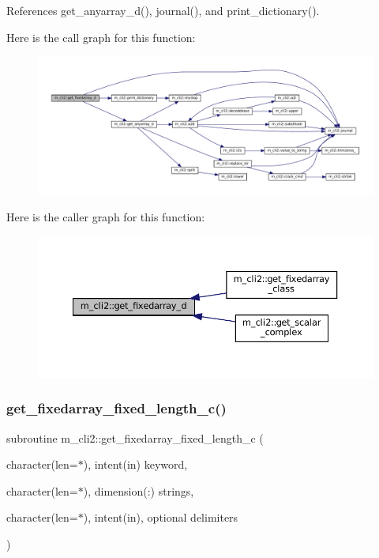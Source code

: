 References get\+\_\+anyarray\+\_\+d(), journal(), and print\+\_\+dictionary().

Here is the call graph for this function\+:
\nopagebreak
\begin{figure}[H]
\begin{center}
\leavevmode
\includegraphics[width=350pt]{namespacem__cli2_a2c8db0f383888cb2b3ce8643de3fae93_cgraph}
\end{center}
\end{figure}
Here is the caller graph for this function\+:
\nopagebreak
\begin{figure}[H]
\begin{center}
\leavevmode
\includegraphics[width=350pt]{namespacem__cli2_a2c8db0f383888cb2b3ce8643de3fae93_icgraph}
\end{center}
\end{figure}
\mbox{\label{namespacem__cli2_a8000c5e05f6c84ba17350d4a00850a6a}} 
\subsubsection{\texorpdfstring{get\+\_\+fixedarray\+\_\+fixed\+\_\+length\+\_\+c()}{get\_fixedarray\_fixed\_length\_c()}}
{\footnotesize\ttfamily subroutine m\+\_\+cli2\+::get\+\_\+fixedarray\+\_\+fixed\+\_\+length\+\_\+c (\begin{DoxyParamCaption}\item[{character(len=$\ast$), intent(in)}]{keyword,  }\item[{character(len=$\ast$), dimension(\+:)}]{strings,  }\item[{character(len=$\ast$), intent(in), optional}]{delimiters }\end{DoxyParamCaption})\hspace{0.3cm}{\ttfamily [private]}}



